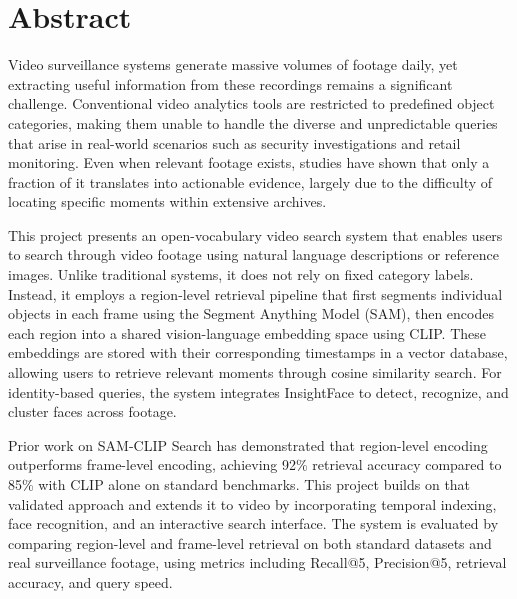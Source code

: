 \chapter*{Abstract}
\label{chap:abstract}

Video surveillance systems generate massive volumes of footage daily, yet extracting useful information from these recordings remains a significant challenge. Conventional video analytics tools are restricted to predefined object categories, making them unable to handle the diverse and unpredictable queries that arise in real-world scenarios such as security investigations and retail monitoring. Even when relevant footage exists, studies have shown that only a fraction of it translates into actionable evidence, largely due to the difficulty of locating specific moments within extensive archives.

This project presents an open-vocabulary video search system that enables users to search through video footage using natural language descriptions or reference images. Unlike traditional systems, it does not rely on fixed category labels. Instead, it employs a region-level retrieval pipeline that first segments individual objects in each frame using the Segment Anything Model (SAM), then encodes each region into a shared vision-language embedding space using CLIP. These embeddings are stored with their corresponding timestamps in a vector database, allowing users to retrieve relevant moments through cosine similarity search. For identity-based queries, the system integrates InsightFace to detect, recognize, and cluster faces across footage.

Prior work on SAM-CLIP Search has demonstrated that region-level encoding outperforms frame-level encoding, achieving 92\% retrieval accuracy compared to 85\% with CLIP alone on standard benchmarks. This project builds on that validated approach and extends it to video by incorporating temporal indexing, face recognition, and an interactive search interface. The system is evaluated by comparing region-level and frame-level retrieval on both standard datasets and real surveillance footage, using metrics including Recall@5, Precision@5, retrieval accuracy, and query speed.